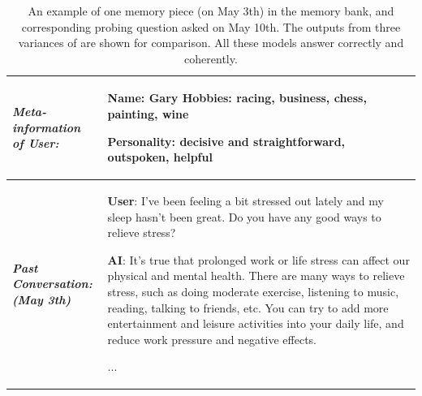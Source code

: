 \begin{table}[t]
\footnotesize %
\caption{An example of one memory piece (on May 3th) in the memory bank, and corresponding probing question asked on May 10th. The outputs from three variances of \chatbot are shown for comparison. All these models answer correctly and coherently.}
\saveSpaceSec
\label{tab:memory_bank_example}
\centering
\begin{tabular}{p{2.3cm}p{11cm}}
\toprule
  \parbox[t]{4cm}{\textbf{\textit{Meta-information}} \\ \textbf{\textit{of User:}}}&
  \textbf{Name:} Gary \quad \textbf{Hobbies:} racing, business, chess, painting, wine
  
  \textbf{Personality:} decisive and straightforward, outspoken, helpful\\
  \hline
  \parbox[t]{4cm}{\textbf{\textit{Past Conversation:}} \\ \textbf{\textit{(May 3th)}}}& \textbf{User}: I've been feeling a bit stressed out lately and my sleep hasn't been great. Do you have any good ways to relieve stress?
  
\textbf{AI}: It's true that prolonged work or life stress can affect our physical and mental health. There are many ways to relieve stress, such as doing moderate exercise, listening to music, reading, talking to friends, etc. You can try to add more entertainment and leisure activities into your daily life, and reduce work pressure and negative effects.

...


\end{tabular}
\end{table}
